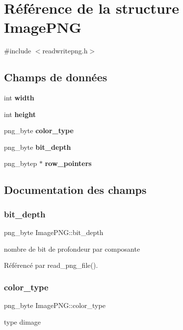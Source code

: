 \section{Référence de la structure Image\+P\+NG}
\label{structImagePNG}


{\ttfamily \#include $<$readwritepng.\+h$>$}

\subsection*{Champs de données}
\begin{DoxyCompactItemize}
\item 
int \textbf{ width}
\item 
int \textbf{ height}
\item 
png\+\_\+byte \textbf{ color\+\_\+type}
\item 
png\+\_\+byte \textbf{ bit\+\_\+depth}
\item 
png\+\_\+bytep $\ast$ \textbf{ row\+\_\+pointers}
\end{DoxyCompactItemize}


\subsection{Documentation des champs}
\mbox{\label{structImagePNG_a154234aa7f4e831c28e067521f68a3d1}} 
\subsubsection{bit\+\_\+depth}
{\footnotesize\ttfamily png\+\_\+byte Image\+P\+N\+G\+::bit\+\_\+depth}

nombre de bit de profondeur par composante 

Référencé par read\+\_\+png\+\_\+file().

\mbox{\label{structImagePNG_a2b6155f88d1b6efca879367e4f790932}} 
\subsubsection{color\+\_\+type}
{\footnotesize\ttfamily png\+\_\+byte Image\+P\+N\+G\+::color\+\_\+type}

type d\textquotesingle{}image 

